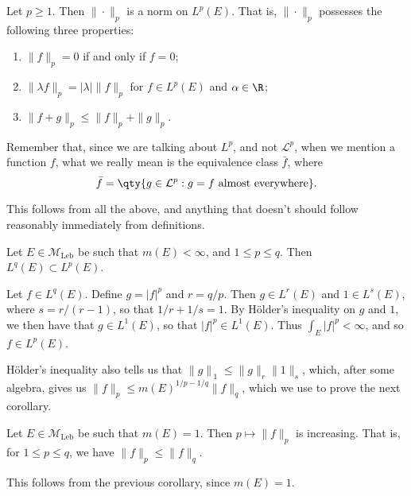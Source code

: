 \documentclass{maths}
\newcommand{\mleb}{\mathcal{M}_{\text{Leb}}}
\newcommand{\lp}{\mathcal{L}^p}
\begin{document}
\begin{prop}
    Let $p\geqslant1$.
    Then $\|\cdot\|_p$ is a norm on $L^p(E)$.
    That is, $\|\cdot\|_p$ possesses the following three properties:
    \begin{enumerate}
        \item $\|f\|_p=0$ if and only if $f=0$;
        \item $\|\lambda f\|_p=|\lambda|\|f\|_p$ for $f\in L^p(E)$ and $\alpha\in\R$;
        \item $\|f+g\|_p\leqslant\|f\|_p+\|g\|_p$.
    \end{enumerate}

    Remember that, since we are talking about $L^p$, and not $\lp$, when we mention a function $f$, what we really mean is the equivalence class $\bar{f}$, where
    \[
    \bar{f}=\qty{g\in\lp : g=f \text{ almost everywhere}}.
    \]
\end{prop}

\begin{prf}
    This follows from all the above, and anything that doesn't should follow reasonably immediately from definitions.
\end{prf}

\begin{cor}
    Let $E\in\mleb$ be such that $m(E)<\infty$, and $1\leqslant p\leqslant q$.
    Then $L^q(E)\subset L^p(E)$.
\end{cor}

\begin{prf}
    Let $f\in L^q(E)$.
    Define $g=|f|^p$ and $r=q/p$.
    Then $g\in L^r(E)$ and $1\in L^s(E)$, where $s=r/(r-1)$, so that $1/r+1/s=1$.
    By H\"older's inequality on $g$ and $1$, we then have that $g\in L^1(E)$, so that $|f|^p\in L^1(E)$.
    Thus $\int_E |f|^p<\infty$, and so $f\in L^p(E)$.

    H\"older's inequality also tells us that $\|g\|_{~1}\leqslant\|g\|_r\|1\|_s$, which, after some algebra, gives us $\|f\|_p\leqslant m(E)^{1/p-1/q}\|f\|_q$, which we use to prove the next corollary.
\end{prf}

\begin{cor}
    Let $E\in\mleb$ be such that $m(E)=1$.
    Then $p\mapsto\|f\|_p$ is increasing.
    That is, for $1\leqslant p\leqslant q$, we have $\|f\|_p\leqslant\|f\|_q$.
\end{cor}

\begin{prf}
    This follows from the previous corollary, since $m(E)=1$.
\end{prf}
\end{document}
